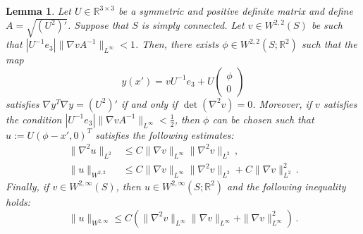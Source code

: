 \documentclass{article}
\theoremstyle{plain}
\theoremstyle{plain}
\theoremstyle{plain}
\newtheorem{lemma}[teo]{Lemma}
\theoremstyle{plain}
\theoremstyle{plain}
\theoremstyle{definition}
\theoremstyle{definition}
\renewcommand{\r}{\mathbb{R}}
\begin{document}
\begin{lemma}\label{lemma:existence_isometry}
    Let $U \in \r^{3 \times 3}$ be a symmetric and positive definite matrix and define $A = \sqrt{(U^2)'}$. Suppose that $S$ is simply connected. Let $v \in W^{2,2}(S)$ be such that $|U^{-1}e_3|\|\nabla v A^{-1}\|_{L^\infty} < 1$. Then, there exists $\phi \in W^{2,2}(S; \r^2)$ such that the map
    \begin{equation}\label{eq:definition_isometry}
        y(x') = vU^{-1}e_3 + U\begin{pmatrix}
            \phi\\
            0
        \end{pmatrix}
    \end{equation}
    satisfies $\nabla y^T \nabla y = (U^2)'$ if and only if $\det(\nabla^2 v) = 0$. Moreover, if $v$ satisfies the condition $|U^{-1}e_3|\|\nabla v A^{-1}\|_{L^\infty} < \frac{1}{2}$, then $\phi$ can be chosen such that $u := U  (\phi - x', 0)^T$ satisfies the following estimates:
    \begin{align}
        \|\nabla^2 u\|_{L^2} & \leq C \|\nabla v\|_{L^\infty} \|\nabla^2 v\|_{L^2} \,, \label{eq:bound_norm_isometry_L2}\\
        \|u\|_{W^{2,2}} & \leq C \|\nabla v\|_{L^\infty} \|\nabla^2 v\|_{L^2} + C \|\nabla v\|^2_{L^2} \label{eq:bound_norm_isometry_W12}\,.
    \end{align}
    Finally, if $v \in W^{2, \infty}(S)$, then $u \in W^{2,\infty}(S; \r^2)$ and the following inequality holds:
    \begin{equation}
        \|u\|_{W^{2, \infty}} \leq C(\|\nabla^2 v\|_{L^\infty}\|\nabla v\|_{L^\infty} + \|\nabla v \|_{L^\infty}^2) \,. \label{eq:bound_norm_isometry_W3}
    \end{equation}
\end{lemma}
\end{document}
